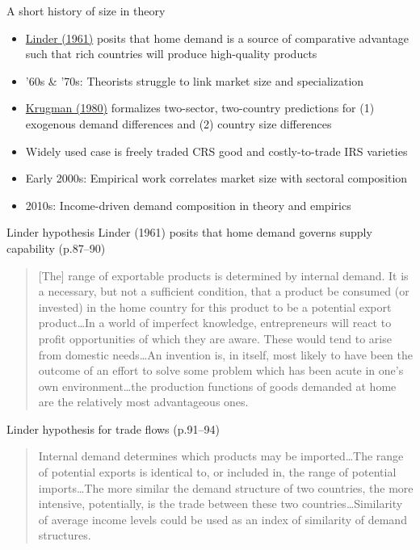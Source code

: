 \documentclass[11pt,notes=hide,aspectratio=169]{beamer}
\begin{document}
\begin{frame}{A short history of size in theory}
\begin{itemize}
	\item \href{https://books.google.com/books?id=fJM_cAAACAAJ}{Linder (1961)} posits that home demand is a source of comparative advantage such that rich countries will produce high-quality products
	\item '60s \& '70s: Theorists struggle to link market size and specialization
	\item \href{https://assets.aeaweb.org/assets/production/journals/aer/top20/70.5.950-959.pdf}{Krugman (1980)} formalizes two-sector, two-country predictions for (1) exogenous demand differences and (2) country size differences
	\item Widely used case is freely traded CRS good and costly-to-trade IRS varieties
	\item Early 2000s: Empirical work correlates market size with sectoral composition
	\item 2010s: Income-driven demand composition in theory and empirics
\end{itemize}
\end{frame}
\begin{frame}{Linder hypothesis}
\linespread{0.95}
Linder (1961) posits that home demand governs supply capability (p.87--90)
\begin{quote}{\footnotesize
[The] range of exportable products is determined by internal demand. It is a necessary, but not a sufficient condition, that a product be consumed (or invested) in the home country for this product to be a potential export product\dots In a world of imperfect knowledge, entrepreneurs will react to profit opportunities of which they are aware. These would tend to arise from domestic needs\dots An invention is, in itself, most likely to have been the outcome of an effort to solve some problem which has been acute in one's own environment\dots the production functions of goods demanded at home are the relatively most advantageous ones.
}\end{quote}
Linder hypothesis for trade flows (p.91--94)
\begin{quote}{\small
Internal demand determines which products may be imported\dots The range of potential exports is identical to, or included in, the range of potential imports\dots The more similar the demand structure of two countries, the more intensive, potentially, is the trade between these two countries\dots Similarity of average income levels could be used as an index of similarity of demand structures.
}\end{quote}
\end{frame}
\end{document}
